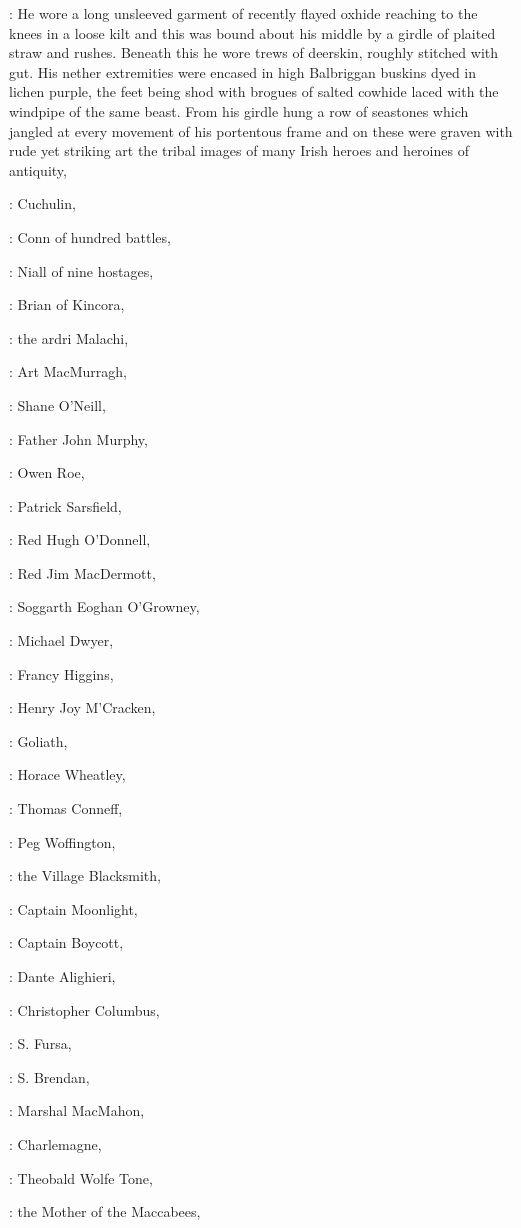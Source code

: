 :
He wore a long unsleeved garment of recently flayed oxhide reaching to the
knees in a loose kilt and this was bound about his middle by a girdle of
plaited straw and rushes. Beneath this he wore trews of deerskin, roughly
stitched with gut. His nether extremities were encased in high Balbriggan
buskins dyed in lichen purple, the feet being shod with brogues of salted
cowhide laced with the windpipe of the same beast. From his girdle hung a
row of seastones which jangled at every movement of his portentous frame
and on these were graven with rude yet striking art the tribal images of
many Irish heroes and heroines of antiquity,

:
Cuchulin,

:
Conn of hundred battles,

:
Niall of nine hostages,

:
Brian of Kincora,

:
the ardri Malachi,

:
Art MacMurragh,

:
Shane O'Neill,

:
Father John Murphy,

:
Owen Roe,

:
Patrick Sarsfield,

:
Red Hugh O'Donnell,

:
Red Jim MacDermott,

:
Soggarth Eoghan O'Growney,

:
Michael Dwyer,

:
Francy Higgins,

:
Henry Joy M'Cracken,

:
Goliath,

:
Horace Wheatley,

:
Thomas Conneff,

:
Peg Woffington,

:
the Village Blacksmith,

:
Captain Moonlight,

:
Captain Boycott,

:
Dante Alighieri,

:
Christopher Columbus,

:
S. Fursa,

:
S. Brendan,

:
Marshal MacMahon,

:
Charlemagne,

:
Theobald Wolfe Tone,

:
the Mother of the Maccabees,

